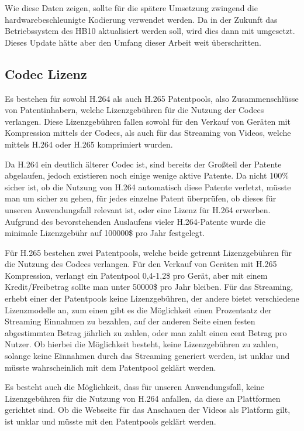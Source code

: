 Wie diese Daten zeigen, sollte für die spätere Umsetzung zwingend die hardwarebeschleunigte Kodierung verwendet werden. Da in der Zukunft das Betriebssystem des HB10 aktualisiert werden soll, wird dies dann mit umgesetzt. Dieses Update hätte aber den Umfang dieser Arbeit weit überschritten.

\subsection{Codec Lizenz}

Es bestehen für sowohl H.264 als auch H.265 Patentpools, also Zusammenschlüsse von Patentinhabern, welche Lizenzgebühren für die Nutzung der Codecs verlangen\cite{Ozer2026AvanciVideo,AccessAdvanceHEVCLicense,Ozer2026H264Fees,AvanciVideo}. 
Diese Lizenzgebühren fallen sowohl für den Verkauf von Geräten mit Kompression mittels der Codecs, als auch für das Streaming von Videos, welche mittels H.264 oder H.265 komprimiert wurden.

Da H.264 ein deutlich älterer Codec ist, sind bereits der Großteil der Patente abgelaufen, jedoch existieren noch einige wenige aktive Patente. Da nicht 100\% sicher ist, ob die Nutzung von H.264 automatisch diese Patente verletzt, müsste man um sicher zu gehen, 
für jedes einzelne Patent überprüfen, ob dieses für unseren Anwendungsfall relevant ist, oder eine Lizenz für H.264 erwerben. 
Aufgrund des bevorstehenden Auslaufens vieler H.264-Patente wurde die minimale Lizenzgebühr auf 100000\$ pro Jahr festgelegt.

Für H.265 bestehen zwei Patentpools, welche beide getrennt Lizenzgebühren für die Nutzung des Codecs verlangen. Für den Verkauf von Geräten mit H.265 Kompression, verlangt ein Patentpool 0,4-1,2\$ pro Gerät, aber mit einem Kredit/Freibetrag sollte man unter 50000\$ pro Jahr bleiben. Für das Streaming,
erhebt einer der Patentpools keine Lizenzgebühren, der andere bietet verschiedene Lizenzmodelle an, zum einen gibt es die Möglichkeit einen Prozentsatz der Streaming Einnahmen zu bezahlen, auf der anderen Seite einen festen abgestimmten Betrag jährlich zu zahlen, oder man zahlt einen cent Betrag pro Nutzer.
Ob hierbei die Möglichkeit besteht, keine Lizenzgebühren zu zahlen, solange keine Einnahmen durch das Streaming generiert werden, ist unklar und müsste wahrscheinlich mit dem Patentpool geklärt werden.

Es besteht auch die Möglichkeit, dass für unseren Anwendungsfall, keine Lizenzgebühren für die Nutzung von H.264 anfallen, da diese an Plattformen gerichtet sind. Ob die Webseite für das Anschauen der Videos als Platform gilt, ist unklar und müsste mit den Patentpools geklärt werden.

